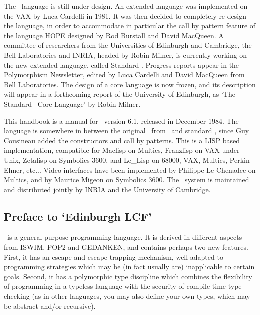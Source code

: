 \documentclass[11pt]{article}
\begin{document}
The \ML\ language is still under design.  An extended language was implemented
on the VAX by Luca Cardelli in 1981.  It was then decided to completely
re-design the language, in order to accommodate in particular the call by
pattern feature of the language HOPE designed by Rod Burstall and David
MacQueen.  A committee of researchers from the Universities of Edinburgh and
Cambridge, the Bell Laboratories and {\small INRIA}, headed by Robin Milner, is
currently working on the new extended language, called Standard \ML.  Progress
reports appear in the Polymorphism Newsletter, edited by Luca Cardelli and
David MacQueen from Bell Laboratories.  The design of a core language is now
frozen, and its description will appear in a forthcoming report of
the University of Edinburgh, as `The Standard \ML\ Core Language' by Robin Milner.

This handbook is a manual for \ML~version 6.1, released in December 1984.
The language is somewhere in between the original \ML\ from \LCF\ and standard
\ML, since Guy Cousineau added the constructors and call by 
patterns.  This is a LISP based implementation, compatible for Maclisp on
Multics, Franzlisp on VAX under Unix, Zetalisp on Symbolics 3600, and Le\_Lisp
on 68000, VAX, Multics, Perkin-Elmer, etc... Video interfaces have been
implemented by Philippe Le Chenadec on Multics, and by Maurice Migeon
on Symbolics 3600.  The \ML\ system is maintained and distributed jointly by
{\small INRIA} and the University of Cambridge.


\subsection{Preface to `Edinburgh LCF'}

\ML\ is a general purpose programming language.  It is derived in different
aspects from {\small ISWIM}, {\small POP2} and {\small GEDANKEN}, and contains
perhaps two new features. First, it has an escape and escape trapping mechanism,
well-adapted to programming strategies which may be (in fact usually are)
inapplicable to certain goals. Second, it has a polymorphic type discipline
which combines the flexibility of programming in a typeless language with the
security of compile-time type checking (as in other languages, you may also
define your own types, which may be abstract and/or recursive).
\end{document}
